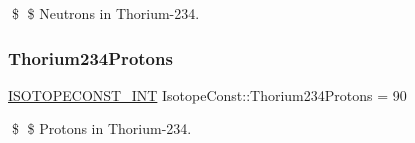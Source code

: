 \$ \$ Neutrons in Thorium-\/234. \mbox{\label{group___isotope_const-_thorium-_th234_ga9f9a53cfa8edb4dbe8b8fb15ee0e6d0b}} 
\subsubsection{\texorpdfstring{Thorium234\+Protons}{Thorium234Protons}}
{\footnotesize\ttfamily \mbox{\hyperlink{group___isotope_const-_macros_ga5f18360b3e99483a35c32d789e62621c}{I\+S\+O\+T\+O\+P\+E\+C\+O\+N\+S\+T\+\_\+\+I\+NT}} Isotope\+Const\+::\+Thorium234\+Protons = 90}

\$ \$ Protons in Thorium-\/234. 